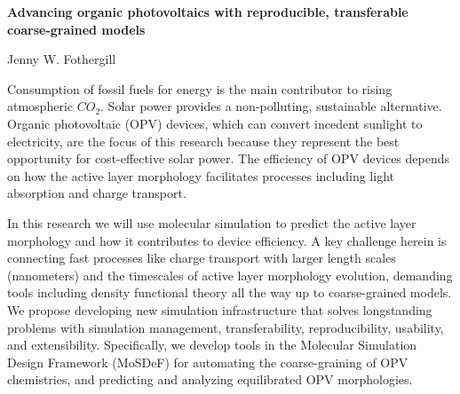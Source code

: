 \documentclass{article}
\begin{document}
\begin{center}
    \large{\textbf{Advancing organic photovoltaics with reproducible, transferable coarse-grained models}}
\end{center}
\begin{center}
    Jenny W. Fothergill
\end{center}

Consumption of fossil fuels for energy is the main contributor to rising atmospheric $CO_{2}$. 
Solar power provides a non-polluting, sustainable alternative.
Organic photovoltaic (OPV) devices, which can convert incedent sunlight to electricity, are the focus of this research because they represent the best opportunity for cost-effective solar power.
The efficiency of OPV devices depends on how the active layer morphology facilitates processes including light absorption and charge transport.

In this research we will use molecular simulation to predict the active layer morphology and how it contributes to device efficiency.
A key challenge herein is connecting fast processes like charge transport with larger length scales (nanometers) and the timescales of active layer morphology evolution, demanding tools including density functional theory all the way up to coarse-grained models.
We propose developing new simulation infrastructure that solves longstanding problems with simulation management, transferability, reproducibility, usability, and extensibility.
Specifically, we develop tools in the Molecular Simulation Design Framework (MoSDeF) for automating the coarse-graining of OPV chemistries, and predicting and analyzing equilibrated OPV morphologies.
\end{document}
